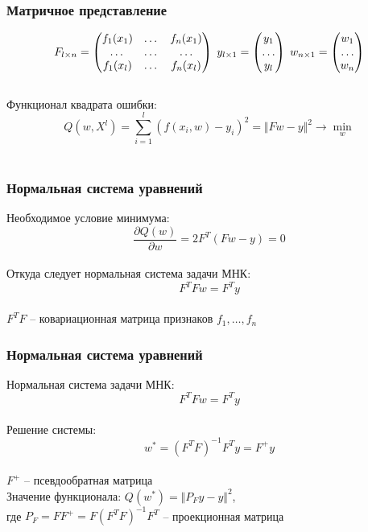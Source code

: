 \documentclass[12pt]{beamer}
\begin{document}
\begin{frame}\frametitle{Матричное представление}
$$F_{l \times n} = \begin{pmatrix}
  f_1(x_1) & \dots & f_n(x_1) \\
  \dots & \dots & \dots\\
  f_1(x_l) & \dots & f_n(x_l)
 \end{pmatrix} \hspace{1mm} y_{l \times 1} = \begin{pmatrix}
  y_1 \\
  \dots\\
  y_l
 \end{pmatrix} \hspace{1mm} w_{n \times 1} = \begin{pmatrix}
  w_1 \\
  \dots\\
  w_n
 \end{pmatrix}$$ \\
\vspace{5mm}
Функционал квадрата ошибки:\\
$$Q(w,X^l) = \sum\limits_{i=1}^l (f (x_i, w) - y_i)^2  = \Vert Fw - y \Vert^2 \rightarrow \min\limits_{w}$$\\

\end{frame}

\begin{frame}\frametitle{Нормальная система уравнений}
Необходимое условие минимума:\\
$$\frac{\partial Q(w)}{\partial w}  = 2 F^T(F w - y) = 0$$\\
Откуда следует нормальная система задачи МНК:\\
$$F^TFw = F^Ty$$\\
$F^TF$ -- ковариационная матрица признаков $f_1, \dots, f_n$\\
\end{frame}

\begin{frame}\frametitle{Нормальная система уравнений}
Нормальная система задачи МНК:
$$F^TFw = F^Ty$$\\
Решение системы:\\
$$w^* = (F^TF)^{-1}F^Ty = F^+y$$\\
$F^+$ -- псевдообратная матрица\\
\vspace{5mm}
Значение функционала: $Q(w^*) = \Vert P_F y - y \Vert^2$,\\
где $P_F = FF^+ = F(F^TF)^{-1}F^T$ -- проекционная матрица
\end{frame}
\end{document}
